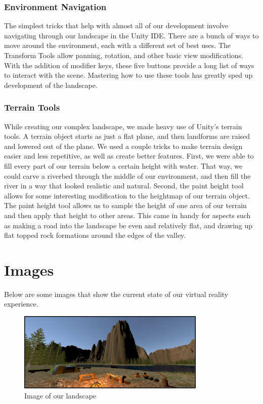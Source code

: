 \documentclass[10pt,journal,compsoc,onecolumn, draftclsnofoot]{IEEEtran}
\begin{document}
\subsubsection{Environment Navigation}
The simplest tricks that help with almost all of our development involve navigating through our landscape in the Unity IDE.
There are a bunch of ways to move around the environment, each with a different set of best uses.
The Transform Tools allow panning, rotation, and other basic view modifications.
With the addition of modifier keys, these five buttons provide a long list of ways to interact with the scene.
Mastering how to use these tools has greatly sped up development of the landscape.

\subsubsection{Terrain Tools}
While creating our complex landscape, we made heavy use of Unity's terrain tools.
A terrain object starts as just a flat plane, and then landforms are raised and lowered out of the plane.
We used a couple tricks to make terrain design easier and less repetitive, as well as create better features.
First, we were able to fill every part of our terrain below a certain height with water.
That way, we could carve a riverbed through the middle of our environment, and then fill the river in a way that looked realistic and natural.
Second, the paint height tool allows for some interesting modification to the heightmap of our terrain object.
The paint height tool allows us to sample the height of one area of our terrain and then apply that height to other areas.
This came in handy for aspects such as making a road into the landscape be even and relatively flat, and drawing up flat topped rock formations around the edges of the valley.

\section{Images}
Below are some images that show the current state of our virtual reality experience.

\vspace{1cm}

\begin{figure}[h]
    \centering
    \includegraphics[width=0.80\textwidth]{landscape.png}
    \caption{Image of our landscape}
\end{figure}
\end{document}
